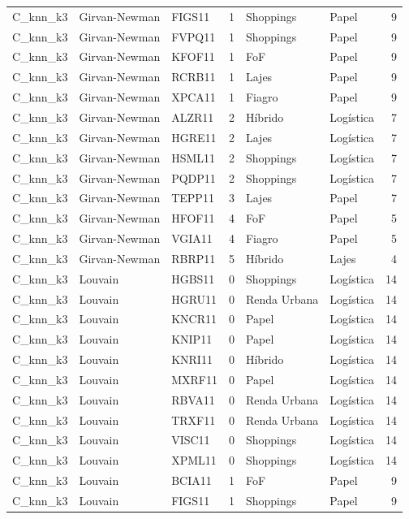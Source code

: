 \begin{tabular}{lllrllr}
C\_knn\_k3 & Girvan-Newman & FIGS11 & 1 & Shoppings & Papel & 9 \\
C\_knn\_k3 & Girvan-Newman & FVPQ11 & 1 & Shoppings & Papel & 9 \\
C\_knn\_k3 & Girvan-Newman & KFOF11 & 1 & FoF & Papel & 9 \\
C\_knn\_k3 & Girvan-Newman & RCRB11 & 1 & Lajes & Papel & 9 \\
C\_knn\_k3 & Girvan-Newman & XPCA11 & 1 & Fiagro & Papel & 9 \\
C\_knn\_k3 & Girvan-Newman & ALZR11 & 2 & Híbrido & Logística & 7 \\
C\_knn\_k3 & Girvan-Newman & HGRE11 & 2 & Lajes & Logística & 7 \\
C\_knn\_k3 & Girvan-Newman & HSML11 & 2 & Shoppings & Logística & 7 \\
C\_knn\_k3 & Girvan-Newman & PQDP11 & 2 & Shoppings & Logística & 7 \\
C\_knn\_k3 & Girvan-Newman & TEPP11 & 3 & Lajes & Papel & 7 \\
C\_knn\_k3 & Girvan-Newman & HFOF11 & 4 & FoF & Papel & 5 \\
C\_knn\_k3 & Girvan-Newman & VGIA11 & 4 & Fiagro & Papel & 5 \\
C\_knn\_k3 & Girvan-Newman & RBRP11 & 5 & Híbrido & Lajes & 4 \\
C\_knn\_k3 & Louvain & HGBS11 & 0 & Shoppings & Logística & 14 \\
C\_knn\_k3 & Louvain & HGRU11 & 0 & Renda Urbana & Logística & 14 \\
C\_knn\_k3 & Louvain & KNCR11 & 0 & Papel & Logística & 14 \\
C\_knn\_k3 & Louvain & KNIP11 & 0 & Papel & Logística & 14 \\
C\_knn\_k3 & Louvain & KNRI11 & 0 & Híbrido & Logística & 14 \\
C\_knn\_k3 & Louvain & MXRF11 & 0 & Papel & Logística & 14 \\
C\_knn\_k3 & Louvain & RBVA11 & 0 & Renda Urbana & Logística & 14 \\
C\_knn\_k3 & Louvain & TRXF11 & 0 & Renda Urbana & Logística & 14 \\
C\_knn\_k3 & Louvain & VISC11 & 0 & Shoppings & Logística & 14 \\
C\_knn\_k3 & Louvain & XPML11 & 0 & Shoppings & Logística & 14 \\
C\_knn\_k3 & Louvain & BCIA11 & 1 & FoF & Papel & 9 \\
C\_knn\_k3 & Louvain & FIGS11 & 1 & Shoppings & Papel & 9 \\

\end{tabular}
